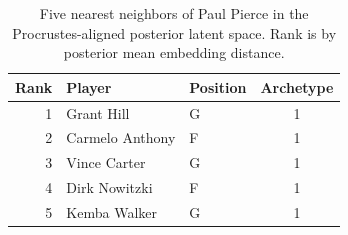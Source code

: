 \begin{table}[htbp]
  \centering\small
  \begin{tabular}{rllc}
    \toprule
    Rank & Player & Position & Archetype \\
    \midrule
    1 & Grant Hill & G & 1 \\
    2 & Carmelo Anthony & F & 1 \\
    3 & Vince Carter & G & 1 \\
    4 & Dirk Nowitzki & F & 1 \\
    5 & Kemba Walker & G & 1 \\
    \bottomrule
  \end{tabular}
  \caption{Five nearest neighbors of Paul Pierce in the Procrustes-aligned posterior latent space. Rank is by posterior mean embedding distance.}
  \label{tab:Paul_Pierce_neighbors}
\end{table}

